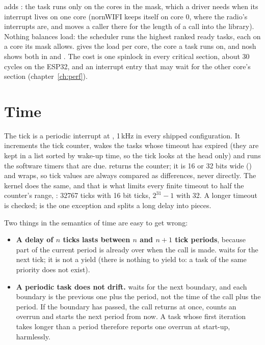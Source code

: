  adds : the
task runs only on the cores in the mask, which a driver needs when its interrupt lives on
one core (nornWIFI keeps itself on core 0, where the radio's interrupts are, and moves a
caller there for the length of a call into the library). Nothing balances load: the
scheduler runs the highest ranked ready tasks, each on a core its mask allows.
 gives the load per core, 
the core a task runs on, and nosh shows both in  and . The cost
is one spinlock in every critical section, about 30 cycles on the ESP32, and an interrupt
entry that may wait for the other core's section (chapter~\ref{ch:perf}).

\section{Time}
\label{sec:time}

The tick is a periodic interrupt at , 1\,kHz in every shipped
configuration. It increments the tick counter, wakes the tasks whose timeout has
expired (they are kept in a list sorted by wake-up time, so the tick looks at the head
only) and runs the software timers that are due.  returns the
counter; it is 16 or 32 bits wide () and wraps, so tick
values are always compared as differences, never directly. The kernel does the same, and
that is what limits every finite timeout to half the counter's range,
: 32767 ticks with 16 bit ticks, $2^{31}-1$ with 32. A longer
timeout is checked;  is the one exception and splits a long delay into
pieces.

Two things in the semantics of time are easy to get wrong:

\begin{itemize}
\item \textbf{A delay of $n$ ticks lasts between $n$ and $n+1$ tick periods}, because
  part of the current period is already over when the call is made. 
  waits for the next tick; it is not a yield (there is nothing to yield to: a task of the
  same priority does not exist).
\item \textbf{A periodic task does not drift.}  waits
  for the next boundary, and each boundary is the previous one plus the period, not the
  time of the call plus the period. If the boundary has passed, the call returns at once,
  counts an overrun and starts the next period from now. A task whose first iteration
  takes longer than a period therefore reports one overrun at start-up, harmlessly.
\end{itemize}

